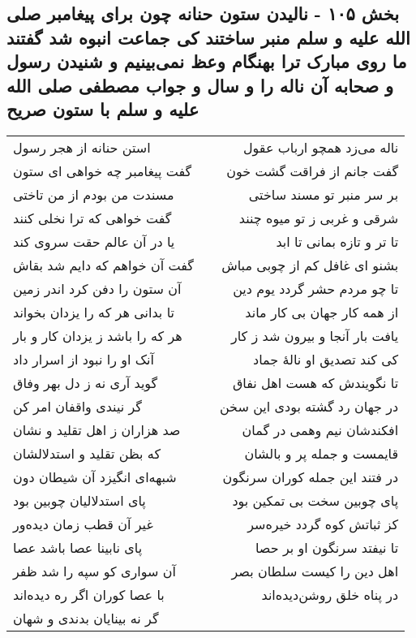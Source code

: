 \begin{center}
\section*{بخش ۱۰۵ - نالیدن ستون حنانه چون برای پیغامبر صلی الله علیه و سلم منبر ساختند کی جماعت انبوه شد گفتند ما روی مبارک ترا بهنگام وعظ نمی‌بینیم و شنیدن رسول و صحابه آن ناله را و سال و جواب مصطفی صلی الله علیه و سلم با ستون صریح}
\label{sec:sh105}
\begin{longtable}{l p{0.5cm} r}
استن حنانه از هجر رسول
&&
ناله می‌زد همچو ارباب عقول
\\
گفت پیغامبر چه خواهی ای ستون
&&
گفت جانم از فراقت گشت خون
\\
مسندت من بودم از من تاختی
&&
بر سر منبر تو مسند ساختی
\\
گفت خواهی که ترا نخلی کنند
&&
شرقی و غربی ز تو میوه چنند
\\
یا در آن عالم حقت سروی کند
&&
تا تر و تازه بمانی تا ابد
\\
گفت آن خواهم که دایم شد بقاش
&&
بشنو ای غافل کم از چوبی مباش
\\
آن ستون را دفن کرد اندر زمین
&&
تا چو مردم حشر گردد یوم دین
\\
تا بدانی هر که را یزدان بخواند
&&
از همه کار جهان بی کار ماند
\\
هر که را باشد ز یزدان کار و بار
&&
یافت بار آنجا و بیرون شد ز کار
\\
آنک او را نبود از اسرار داد
&&
کی کند تصدیق او نالهٔ جماد
\\
گوید آری نه ز دل بهر وفاق
&&
تا نگویندش که هست اهل نفاق
\\
گر نیندی واقفان امر کن
&&
در جهان رد گشته بودی این سخن
\\
صد هزاران ز اهل تقلید و نشان
&&
افکندشان نیم وهمی در گمان
\\
که بظن تقلید و استدلالشان
&&
قایمست و جمله پر و بالشان
\\
شبهه‌ای انگیزد آن شیطان دون
&&
در فتند این جمله کوران سرنگون
\\
پای استدلالیان چوبین بود
&&
پای چوبین سخت بی تمکین بود
\\
غیر آن قطب زمان دیده‌ور
&&
کز ثباتش کوه گردد خیره‌سر
\\
پای نابینا عصا باشد عصا
&&
تا نیفتد سرنگون او بر حصا
\\
آن سواری کو سپه را شد ظفر
&&
اهل دین را کیست سلطان بصر
\\
با عصا کوران اگر ره دیده‌اند
&&
در پناه خلق روشن‌دیده‌اند
\\
گر نه بینایان بدندی و شهان

\end{longtable}
\end{center}
